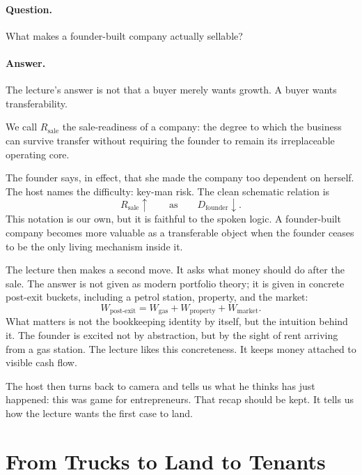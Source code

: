 \paragraph{Question.} What makes a founder-built company actually sellable?

\paragraph{Answer.} The lecture's answer is not that a buyer merely wants growth. A buyer wants transferability.

\begin{definition}
We call \(R_{\text{sale}}\) the sale-readiness of a company: the degree to which the business can survive transfer without requiring the founder to remain its irreplaceable operating core.
\end{definition}

The founder says, in effect, that she made the company too dependent on herself. The host names the difficulty: key-man risk. The clean schematic relation is
\begin{equation}
R_{\text{sale}}\uparrow \qquad \text{as} \qquad D_{\text{founder}}\downarrow.
\end{equation}
This notation is our own, but it is faithful to the spoken logic. A founder-built company becomes more valuable as a transferable object when the founder ceases to be the only living mechanism inside it.

The lecture then makes a second move. It asks what money should do after the sale. The answer is not given as modern portfolio theory; it is given in concrete post-exit buckets, including a petrol station, property, and the market:
\begin{equation}
W_{\text{post-exit}}=W_{\text{gas}}+W_{\text{property}}+W_{\text{market}}.
\end{equation}
What matters is not the bookkeeping identity by itself, but the intuition behind it. The founder is excited not by abstraction, but by the sight of rent arriving from a gas station. The lecture likes this concreteness. It keeps money attached to visible cash flow.

The host then turns back to camera and tells us what he thinks has just happened: this was game for entrepreneurs. That recap should be kept. It tells us how the lecture wants the first case to land.

\section{From Trucks to Land to Tenants}

